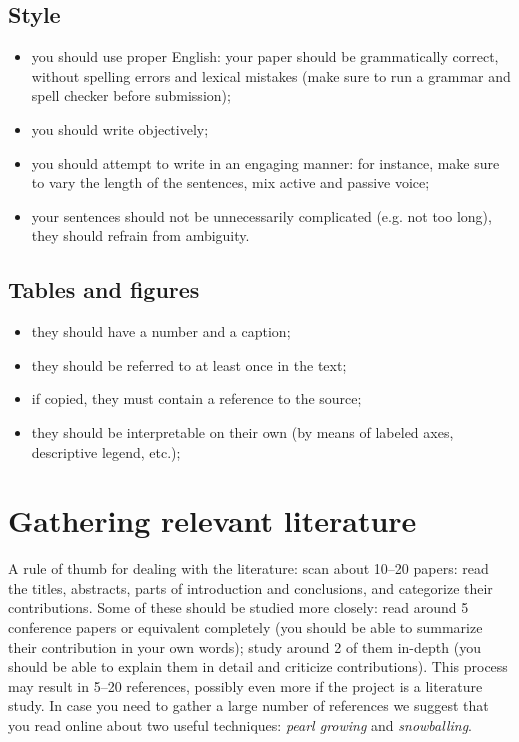 \subsection{Style}
\begin{itemize}
\item you should use proper English: your paper should be grammatically correct, without spelling errors and lexical mistakes (make sure to run a grammar and spell checker before submission);
\item you should write objectively;
\item you should attempt to write in an engaging manner: for instance, make sure to vary the length of the sentences, mix active and passive voice;
\item your sentences should not be unnecessarily complicated (e.g. not too long), they should refrain from ambiguity.
\end{itemize}

\subsection{Tables and figures}
\begin{itemize}
\item they should have a number and a caption;
\item they should be referred to at least once in the text;
\item if copied, they must contain a reference to the source;
\item they should be interpretable on their own (by means of labeled axes, descriptive legend, etc.);
\end{itemize}

\section{Gathering relevant literature}
A rule of thumb for dealing with the literature: scan about 10--20 papers: read the titles, abstracts, parts of introduction and conclusions, and categorize their contributions. Some of these should be studied more closely: read around 5 conference papers or equivalent completely (you should be able to summarize their contribution in your own words); study around 2 of them in-depth (you should be able to explain them in detail and criticize contributions). This process may result in 5--20 references, possibly even more if the project is a literature study. In case you need to gather a large number of references we suggest that you read online about two useful techniques: \textit{pearl growing} and \textit{snowballing}.
